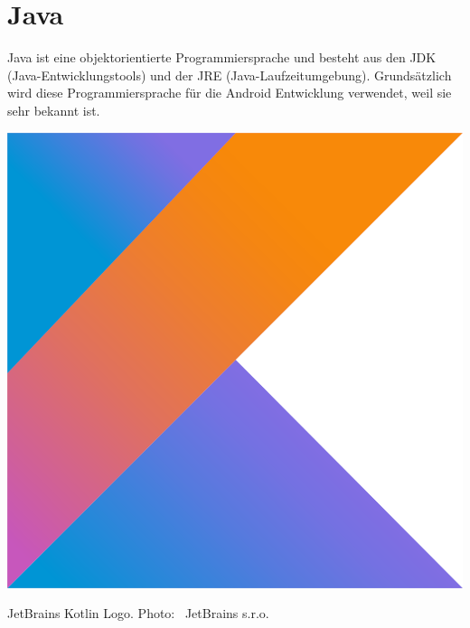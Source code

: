 \documentclass{sigchi-ext}
\begin{document}
\section{Java}
Java ist eine objektorientierte Programmiersprache und besteht aus den JDK (Java-Entwicklungstools) und der JRE
 (Java-Laufzeitumgebung). Grundsätzlich wird diese Programmiersprache für die Android Entwicklung 
 verwendet, weil sie sehr bekannt ist.


\begin{marginfigure}[-12pc]
  \begin{minipage}{\marginparwidth}
    \centering
    \includegraphics[width=0.9\marginparwidth]{figures/kotlinlogo.png}
    \caption{JetBrains Kotlin Logo. Photo:
      \cczero~JetBrains s.r.o.}
  \end{minipage}
\end{marginfigure}
\end{document}
